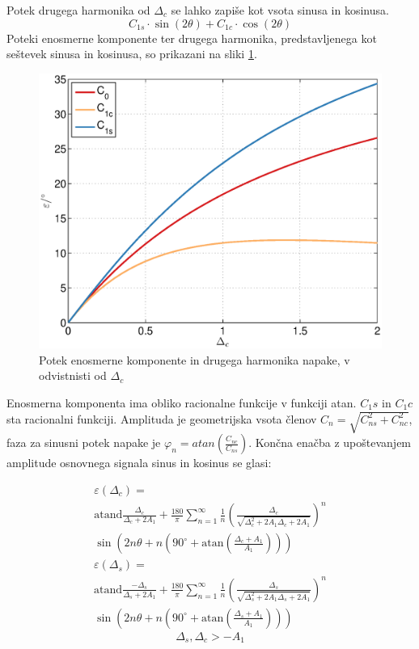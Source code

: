 \documentclass[a4paper]{article}
\begin{document}
Potek drugega harmonika od $\Delta_c$ se lahko zapiše kot vsota sinusa in kosinusa.
\begin{equation}
C_{1s} \cdot\sin(2\theta)+C_{1c} \cdot\cos(2\theta)
\end{equation}
Poteki enosmerne komponente ter drugega harmonika, predstavljenega kot seštevek sinusa in kosinusa, so prikazani na sliki \ref{fig:dc}.
\begin{figure}[!htb]
	\begin{center}
		\includegraphics[width=\linewidth]{./Slike/dc.eps}
		\caption{Potek enosmerne komponente in drugega harmonika napake, v odvistnisti od $\Delta_{c}$} \label{fig:dc}
	\end{center}
\end{figure}

Enosmerna komponenta ima obliko racionalne funkcije v funkciji atan.
$C_1s$ in $C_1c$ sta racionalni funkciji. Amplituda je geometrijska vsota členov $C_n = \sqrt{C_{ns}^2+C_{nc}^2}$, faza za sinusni potek napake je $\varphi_{n} = atan(\frac{C_{nc}}{C_{ns}})$. Končna enačba z upoštevanjem amplitude osnovnega signala sinus in kosinus se glasi:

\begin{multline}
\label{equ:dc_err}
\varepsilon(\Delta_c) =\\ \mathrm{atand}\frac{\Delta_c}{\Delta_c+2 A_1}+\frac{180}{\pi} \sum_{n=1}^{\infty}\frac{1}{n} (\frac{\Delta_c}{\sqrt{\Delta_c^2+2 A_1 \Delta_c+2 A_1}})^n\\ \sin (2n \theta+n (90^\circ+ \mathrm{ atan}(\frac{\Delta_c+A_1}{A_1})))
\end{multline}
\begin{multline}
\label{equ:ds_err}
\varepsilon(\Delta_s) =\\ \mathrm{atand}\frac{-\Delta_s}{\Delta_s+2 A_1}+\frac{180}{\pi} \sum_{n=1}^{\infty}\frac{1}{n} (\frac{\Delta_s}{\sqrt{\Delta_s^2+2 A_1 \Delta_s+2A_1}})^n\\ \sin (2n \theta+n (90^\circ+ \mathrm{ atan}(\frac{\Delta_s+A_1}{A_1})))
\end{multline}
\begin{equation*}
\Delta_s, \Delta_c > -A_1
\end{equation*}
\end{document}
